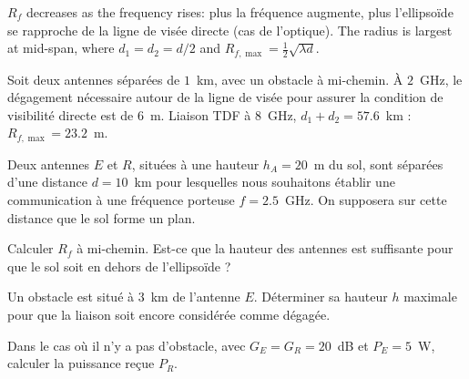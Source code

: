 \begin{remark}
  $R_f$ decreases as the frequency rises: plus la fréquence augmente, plus
  l'ellipsoïde se rapproche de la ligne de visée directe (cas de l'optique).
  The radius is largest at mid-span, where $d_1 = d_2 = d/2$ and
  $R_{f,\max} = \frac{1}{2}\sqrt{\lambda d}$.
\end{remark}

\begin{example}
  Soit deux antennes séparées de $1$~km, avec un obstacle à mi-chemin. À
  $2$~GHz, le dégagement nécessaire autour de la ligne de visée pour assurer la
  condition de visibilité directe est de $6$~m. Liaison TDF à $8$~GHz,
  $d_1 + d_2 = 57.6$~km : $R_{f,\max} = 23.2$~m.
\end{example}

\begin{figure}[h!]
  \centering
\end{figure}

\begin{problem}
  Deux antennes $E$ et $R$, situées à une hauteur $h_A = 20$~m du sol, sont
  séparées d'une distance $d = 10$~km pour lesquelles nous souhaitons établir
  une communication à une fréquence porteuse $f = 2.5$~GHz. On supposera sur
  cette distance que le sol forme un plan.
  \begin{subpart}
    \item Calculer $R_f$ à mi-chemin. Est-ce que la hauteur des antennes est
      suffisante pour que le sol soit en dehors de l'ellipsoïde ?
    \item Un obstacle est situé à $3$~km de l'antenne $E$. Déterminer sa
      hauteur $h$ maximale pour que la liaison soit encore considérée comme
      dégagée.
    \item Dans le cas où il n'y a pas d'obstacle, avec $G_E = G_R = 20$~dB et
      $P_E = 5$~W, calculer la puissance reçue $P_R$.
  \end{subpart}
\end{problem}

